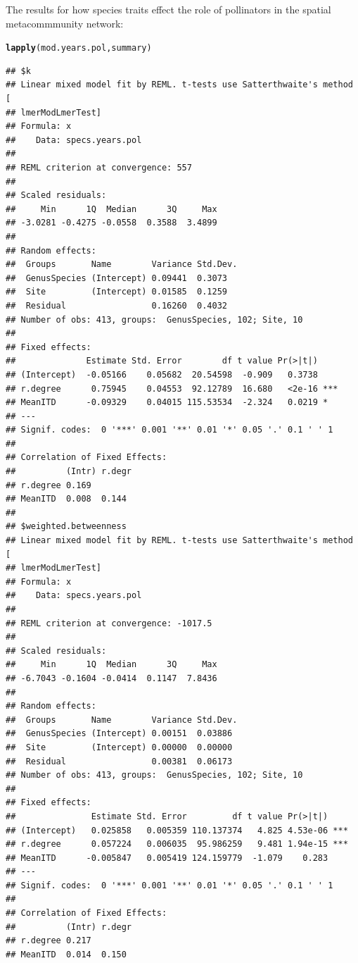 \documentclass{article}\usepackage[]{graphicx}\usepackage[]{color}
\makeatletter
\newcommand{\hlstd}[1]{\textcolor[rgb]{0.345,0.345,0.345}{#1}}%
\newcommand{\hlkwd}[1]{\textcolor[rgb]{0.737,0.353,0.396}{\textbf{#1}}}%
\newenvironment{kframe}{%
 \def\at@end@of@kframe{}%
 \ifinner\ifhmode%
  \def\at@end@of@kframe{\end{minipage}}%
  \begin{minipage}{\columnwidth}%
 \fi\fi%
 \def\FrameCommand##1{\hskip\@totalleftmargin \hskip-\fboxsep
 \colorbox{shadecolor}{##1}\hskip-\fboxsep
     \hskip-\linewidth \hskip-\@totalleftmargin \hskip\columnwidth}%
 \MakeFramed {\advance\hsize-\width
   \@totalleftmargin\z@ \linewidth\hsize
   \@setminipage}}%
 {\par\unskip\endMakeFramed%
 \at@end@of@kframe}
\newenvironment{knitrout}{}{} %
\makeatother
\begin{document}
The results for how species traits effect the role of pollinators in
the spatial metacommmunity network: 
\begin{knitrout}
\color{fgcolor}\begin{kframe}
\begin{alltt}
\hlkwd{lapply}\hlstd{(mod.years.pol, summary)}
\end{alltt}
\begin{verbatim}
## $k
## Linear mixed model fit by REML. t-tests use Satterthwaite's method [
## lmerModLmerTest]
## Formula: x
##    Data: specs.years.pol
## 
## REML criterion at convergence: 557
## 
## Scaled residuals: 
##     Min      1Q  Median      3Q     Max 
## -3.0281 -0.4275 -0.0558  0.3588  3.4899 
## 
## Random effects:
##  Groups       Name        Variance Std.Dev.
##  GenusSpecies (Intercept) 0.09441  0.3073  
##  Site         (Intercept) 0.01585  0.1259  
##  Residual                 0.16260  0.4032  
## Number of obs: 413, groups:  GenusSpecies, 102; Site, 10
## 
## Fixed effects:
##              Estimate Std. Error        df t value Pr(>|t|)    
## (Intercept)  -0.05166    0.05682  20.54598  -0.909   0.3738    
## r.degree      0.75945    0.04553  92.12789  16.680   <2e-16 ***
## MeanITD      -0.09329    0.04015 115.53534  -2.324   0.0219 *  
## ---
## Signif. codes:  0 '***' 0.001 '**' 0.01 '*' 0.05 '.' 0.1 ' ' 1
## 
## Correlation of Fixed Effects:
##          (Intr) r.degr
## r.degree 0.169        
## MeanITD  0.008  0.144 
## 
## $weighted.betweenness
## Linear mixed model fit by REML. t-tests use Satterthwaite's method [
## lmerModLmerTest]
## Formula: x
##    Data: specs.years.pol
## 
## REML criterion at convergence: -1017.5
## 
## Scaled residuals: 
##     Min      1Q  Median      3Q     Max 
## -6.7043 -0.1604 -0.0414  0.1147  7.8436 
## 
## Random effects:
##  Groups       Name        Variance Std.Dev.
##  GenusSpecies (Intercept) 0.00151  0.03886 
##  Site         (Intercept) 0.00000  0.00000 
##  Residual                 0.00381  0.06173 
## Number of obs: 413, groups:  GenusSpecies, 102; Site, 10
## 
## Fixed effects:
##               Estimate Std. Error         df t value Pr(>|t|)    
## (Intercept)   0.025858   0.005359 110.137374   4.825 4.53e-06 ***
## r.degree      0.057224   0.006035  95.986259   9.481 1.94e-15 ***
## MeanITD      -0.005847   0.005419 124.159779  -1.079    0.283    
## ---
## Signif. codes:  0 '***' 0.001 '**' 0.01 '*' 0.05 '.' 0.1 ' ' 1
## 
## Correlation of Fixed Effects:
##          (Intr) r.degr
## r.degree 0.217        
## MeanITD  0.014  0.150
\end{verbatim}
\end{kframe}
\end{knitrout}
\end{document}

